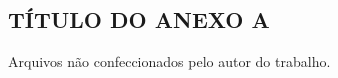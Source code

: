 \begin{anexosenv}
\chapter{TÍTULO DO ANEXO A}

\label{anexoA}

Arquivos não confeccionados pelo autor do trabalho.


\end{anexosenv}